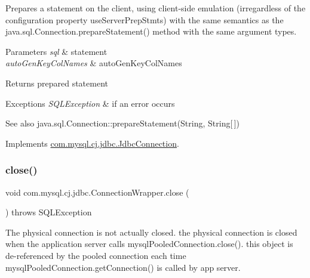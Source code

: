 Prepares a statement on the client, using client-\/side emulation (irregardless of the configuration property \textquotesingle{}use\+Server\+Prep\+Stmts\textquotesingle{}) with the same semantics as the java.\+sql.\+Connection.\+prepare\+Statement() method with the same argument types.


\begin{DoxyParams}{Parameters}
{\em sql} & statement \\
\hline
{\em auto\+Gen\+Key\+Col\+Names} & auto\+Gen\+Key\+Col\+Names \\
\hline
\end{DoxyParams}
\begin{DoxyReturn}{Returns}
prepared statement 
\end{DoxyReturn}

\begin{DoxyExceptions}{Exceptions}
{\em S\+Q\+L\+Exception} & if an error occurs\\
\hline
\end{DoxyExceptions}
\begin{DoxySeeAlso}{See also}
java.\+sql.\+Connection\+::prepare\+Statement(\+String, String\mbox{[}$\,$\mbox{]}) 
\end{DoxySeeAlso}


Implements \mbox{\hyperlink{interfacecom_1_1mysql_1_1cj_1_1jdbc_1_1_jdbc_connection_a46a218367bb0a386a18caed711142d7a}{com.\+mysql.\+cj.\+jdbc.\+Jdbc\+Connection}}.

\mbox{\label{classcom_1_1mysql_1_1cj_1_1jdbc_1_1_connection_wrapper_a1513ad5e208ca46ac61ab5359590a0b9}} 
\subsubsection{\texorpdfstring{close()}{close()}}
{\footnotesize\ttfamily void com.\+mysql.\+cj.\+jdbc.\+Connection\+Wrapper.\+close (\begin{DoxyParamCaption}{ }\end{DoxyParamCaption}) throws S\+Q\+L\+Exception}

The physical connection is not actually closed. the physical connection is closed when the application server calls mysql\+Pooled\+Connection.\+close(). this object is de-\/referenced by the pooled connection each time mysql\+Pooled\+Connection.\+get\+Connection() is called by app server.


